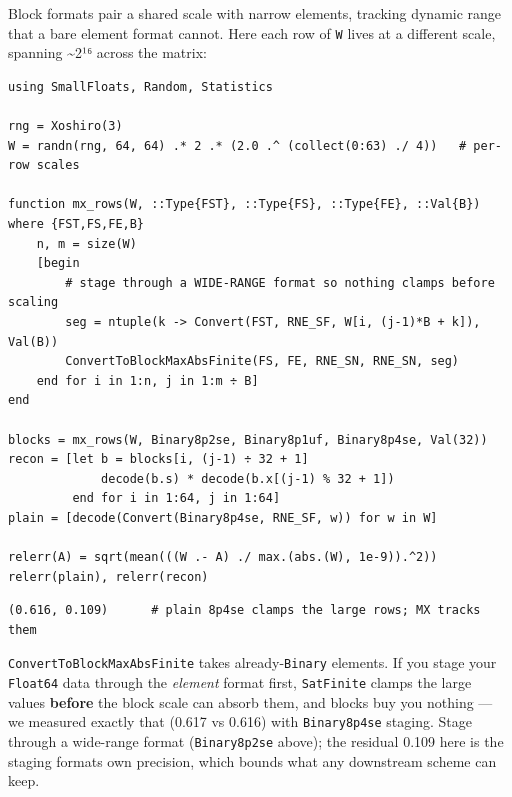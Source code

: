 \label{18175628149299408468}{}


Block formats pair a shared scale with narrow elements, tracking dynamic range that a bare element format cannot. Here each row of \texttt{W} lives at a different scale, spanning {\textasciitilde}2¹⁶ across the matrix:




\nopagebreak[4]
\begin{minipage}{\linewidth}
\begin{verbatim}
using SmallFloats, Random, Statistics

rng = Xoshiro(3)
W = randn(rng, 64, 64) .* 2 .* (2.0 .^ (collect(0:63) ./ 4))   # per-row scales

function mx_rows(W, ::Type{FST}, ::Type{FS}, ::Type{FE}, ::Val{B}) where {FST,FS,FE,B}
    n, m = size(W)
    [begin
        # stage through a WIDE-RANGE format so nothing clamps before scaling
        seg = ntuple(k -> Convert(FST, RNE_SF, W[i, (j-1)*B + k]), Val(B))
        ConvertToBlockMaxAbsFinite(FS, FE, RNE_SN, RNE_SN, seg)
    end for i in 1:n, j in 1:m ÷ B]
end

blocks = mx_rows(W, Binary8p2se, Binary8p1uf, Binary8p4se, Val(32))
recon = [let b = blocks[i, (j-1) ÷ 32 + 1]
             decode(b.s) * decode(b.x[(j-1) % 32 + 1])
         end for i in 1:64, j in 1:64]
plain = [decode(Convert(Binary8p4se, RNE_SF, w)) for w in W]

relerr(A) = sqrt(mean(((W .- A) ./ max.(abs.(W), 1e-9)).^2))
relerr(plain), relerr(recon)
\end{verbatim}




\begin{verbatim}
(0.616, 0.109)      # plain 8p4se clamps the large rows; MX tracks them
\end{verbatim}
\end{minipage}




\begin{tcolorbox}[toptitle=-1mm,bottomtitle=1mm,colback=admonition-warning!50!white,colframe=admonition-warning,title=\textbf{Stage wide, then block-quantize}]
\texttt{ConvertToBlockMaxAbsFinite} takes already-\texttt{Binary} elements. If you stage your \texttt{Float64} data through the \emph{element} format first, \texttt{SatFinite} clamps the large values \textbf{before} the block scale can absorb them, and blocks buy you nothing — we measured exactly that (0.617 vs 0.616) with \texttt{Binary8p4se} staging. Stage through a wide-range format (\texttt{Binary8p2se} above); the residual 0.109 here is the staging format{\textquotesingle}s own precision, which bounds what any downstream scheme can keep.

\end{tcolorbox}


